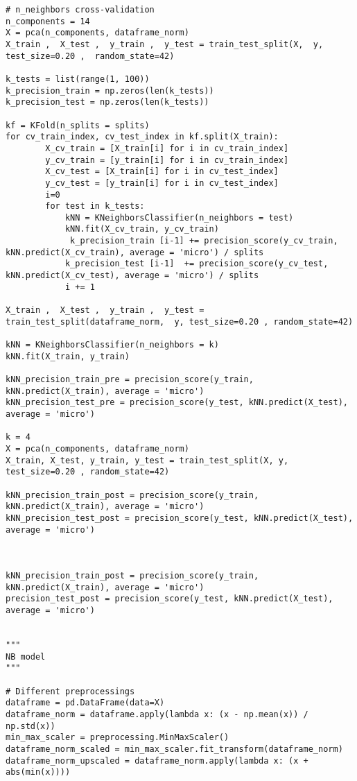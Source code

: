 \begin{lstlisting}
# n_neighbors cross-validation
n_components = 14 
X = pca(n_components, dataframe_norm)
X_train ,  X_test ,  y_train ,  y_test = train_test_split(X,  y,  test_size=0.20 ,  random_state=42)

k_tests = list(range(1, 100))
k_precision_train = np.zeros(len(k_tests))
k_precision_test = np.zeros(len(k_tests))

kf = KFold(n_splits = splits)
for cv_train_index, cv_test_index in kf.split(X_train):
        X_cv_train = [X_train[i] for i in cv_train_index]
        y_cv_train = [y_train[i] for i in cv_train_index]
        X_cv_test = [X_train[i] for i in cv_test_index]
        y_cv_test = [y_train[i] for i in cv_test_index]
        i=0
        for test in k_tests:
            kNN = KNeighborsClassifier(n_neighbors = test)
            kNN.fit(X_cv_train, y_cv_train) 
             k_precision_train [i-1] += precision_score(y_cv_train, kNN.predict(X_cv_train), average = 'micro') / splits
            k_precision_test [i-1]  += precision_score(y_cv_test, kNN.predict(X_cv_test), average = 'micro') / splits
            i += 1

X_train ,  X_test ,  y_train ,  y_test = train_test_split(dataframe_norm,  y, test_size=0.20 , random_state=42)

kNN = KNeighborsClassifier(n_neighbors = k)
kNN.fit(X_train, y_train)

kNN_precision_train_pre = precision_score(y_train, kNN.predict(X_train), average = 'micro')
kNN_precision_test_pre = precision_score(y_test, kNN.predict(X_test), average = 'micro')

k = 4 
X = pca(n_components, dataframe_norm)
X_train, X_test, y_train, y_test = train_test_split(X, y, test_size=0.20 , random_state=42)

kNN_precision_train_post = precision_score(y_train, kNN.predict(X_train), average = 'micro')
kNN_precision_test_post = precision_score(y_test, kNN.predict(X_test), average = 'micro')



kNN_precision_train_post = precision_score(y_train, kNN.predict(X_train), average = 'micro')
precision_test_post = precision_score(y_test, kNN.predict(X_test), average = 'micro')


"""
NB model
"""

# Different preprocessings
dataframe = pd.DataFrame(data=X)
dataframe_norm = dataframe.apply(lambda x: (x - np.mean(x)) / np.std(x))
min_max_scaler = preprocessing.MinMaxScaler()
dataframe_norm_scaled = min_max_scaler.fit_transform(dataframe_norm)
dataframe_norm_upscaled = dataframe_norm.apply(lambda x: (x + abs(min(x))))


\end{lstlisting}
